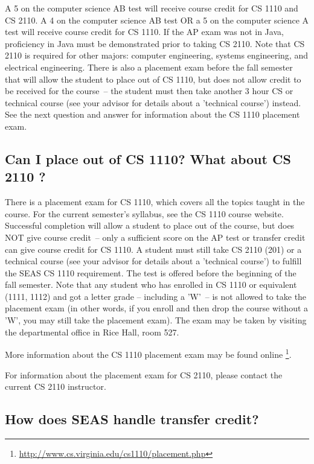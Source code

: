 \documentclass[10pt,letter]{book}
\newcommand{\myurl}[1]{\footnote{\scriptsize\url{#1}}}
\begin{document}
A 5 on the computer science AB test will receive course credit for CS
1110 and CS 2110. A 4 on the computer science AB test OR a
5 on the computer science A test will receive course credit for CS
1110. If the AP exam was not in Java, proficiency in Java must
be demonstrated prior to taking CS 2110. Note that CS 2110
is required for other majors: computer engineering, systems
engineering, and electrical engineering. There is also a placement
exam before the fall semester that will allow the student to place out
of CS 1110, but does not allow credit to be received for the
course~-- the student must then take another 3 hour CS or technical
course (see your advisor for details about a 'technical course')
instead. See the next question and answer for information about the CS
1110 placement exam.

\subsection{Can I place out of CS 1110? What about CS 2110
 ?}
\label{101placement}

There is a placement exam for CS 1110, which covers all the
topics taught in the course. For the current semester's syllabus, see
the CS 1110 course website. Successful completion will allow a
student to place out of the course, but does NOT give course credit~--
only a sufficient score on the AP test or transfer credit can give
course credit for CS 1110. A student must still take CS 2110
(201) or a technical course (see your advisor for details about a
'technical course') to fulfill the SEAS CS 1110 requirement. The
test is offered before the beginning of the fall semester. Note that
any student who has enrolled in CS 1110 or equivalent (1111,
1112) and got a letter grade – including a 'W'~-- is not allowed to
take the placement exam (in other words, if you enroll and then drop
the course without a 'W', you may still take the placement exam). The
exam may be taken by visiting the departmental office in Rice Hall,
room 527.

More information about the CS 1110 placement exam may be found online
\myurl{http://www.cs.virginia.edu/cs1110/placement.php}.

For information about the placement exam for CS 2110, please
contact the current CS 2110 instructor.

\subsection{How does SEAS handle transfer credit?}
\end{document}
